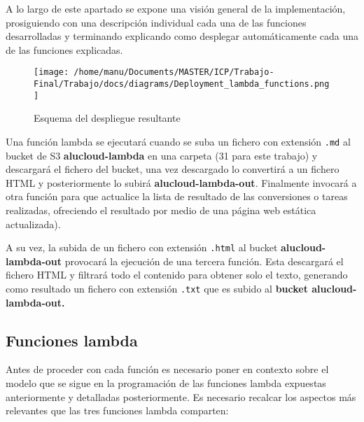 \documentclass[
]{article}
\begin{document}
A lo largo de este apartado se expone una visión general de la
implementación, prosiguiendo con una descripción individual cada una de
las funciones desarrolladas y terminando explicando como desplegar
automáticamente cada una de las funciones explicadas.

\begin{figure}[H]
\centering
\texttt{[image: /home/manu/Documents/MASTER/ICP/Trabajo-Final/Trabajo/docs/diagrams/Deployment\_lambda\_functions.png]}
\caption{Esquema del despliegue resultante}
\end{figure}

Una función lambda se ejecutará cuando se suba un fichero con extensión
\texttt{.md} al bucket de S3 \textbf{alucloud-lambda} en una carpeta (31
para este trabajo) y descargará el fichero del bucket, una vez
descargado lo convertirá a un fichero HTML y posteriormente lo subirá
\textbf{alucloud-lambda-out}. Finalmente invocará a otra función para
que actualice la lista de resultado de las conversiones o tareas
realizadas, ofreciendo el resultado por medio de una página web estática
actualizada).

A su vez, la subida de un fichero con extensión \texttt{.html} al bucket
\textbf{alucloud-lambda-out} provocará la ejecución de una tercera
función. Esta descargará el fichero HTML y filtrará todo el contenido
para obtener solo el texto, generando como resultado un fichero con
extensión \texttt{.txt} que es subido al \textbf{bucket
alucloud-lambda-out.}

\hypertarget{header-n24}{%
\subsection{\texorpdfstring{Funciones lambda
}{Funciones lambda }}\label{header-n24}}

Antes de proceder con cada función es necesario poner en contexto sobre
el modelo que se sigue en la programación de las funciones lambda
expuestas anteriormente y detalladas posteriormente. Es necesario
recalcar los aspectos más relevantes que las tres funciones lambda
comparten:
\end{document}
